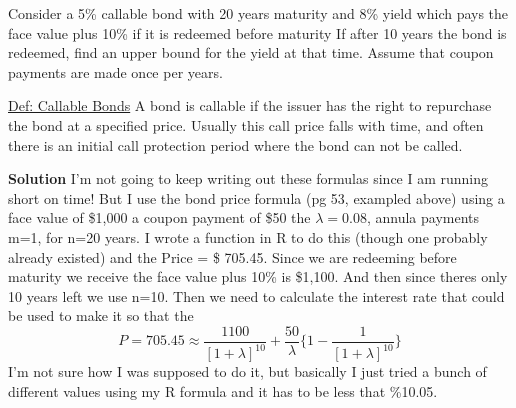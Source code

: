 \documentclass[12pt]{article}
\newenvironment{problem}[2][Problem]{\begin{trivlist}
\item[\hskip \labelsep {\bfseries #1}\hskip \labelsep {\bfseries #2.}]}{\end{trivlist}}
\begin{document}
\begin{problem}{5} Consider a 5\% callable bond with 20 years maturity and 8\% yield which pays the face value plus 10\% if it is redeemed before maturity If after 10 years the bond is redeemed, find an upper bound for the yield at that time. Assume that coupon payments are made once per years. 

\underline{Def: Callable Bonds} A bond is callable if the issuer has the right to repurchase the bond at a specified price. Usually this call price falls with time, and often there is an initial call protection period where the bond can not be called.

\textbf{Solution} I'm not going to keep writing out these formulas since I am running short on time! But I use the bond price formula (pg 53, exampled above) using a face value of \$1,000 a coupon payment of \$50 the $\lambda = 0.08$, annula payments m=1, for n=20 years. I wrote a function in R to do this (though one probably already existed) and the Price = \$ 705.45. Since we are redeeming before maturity we receive the face value plus 10\% is \$1,100.  And then since theres only 10 years left we use n=10. Then we need to calculate the interest rate that could be used to make it so that the $$ P = 705.45 \approx \frac{1100}{[1+\lambda]^{10}} + \frac{50}{\lambda }\{ 1- \frac{1}{[1+\lambda ]^{10}}\}$$
I'm not sure how I was supposed to do it, but basically I just tried a bunch of different values using my R formula and it has to be less that \%10.05. 

\end{problem}
\end{document}
